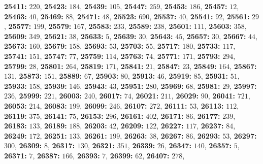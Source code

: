 \textsf{\bfseries 25411:} $220$, \textsf{\bfseries 25423:} $184$, \textsf{\bfseries 25439:} $105$, \textsf{\bfseries 25447:} $259$, \textsf{\bfseries 25453:} $186$, \textsf{\bfseries 25457:} $12$, \textsf{\bfseries 25463:} $40$, \textsf{\bfseries 25469:} $88$, \textsf{\bfseries 25471:} $48$, \textsf{\bfseries 25523:} $690$, \textsf{\bfseries 25537:} $40$, \textsf{\bfseries 25541:} $92$, \textsf{\bfseries 25561:} $29$, \textsf{\bfseries 25577:} $199$, \textsf{\bfseries 25579:} $167$, \textsf{\bfseries 25583:} $233$, \textsf{\bfseries 25589:} $238$, \textsf{\bfseries 25601:} $111$, \textsf{\bfseries 25603:} $358$, \textsf{\bfseries 25609:} $349$, \textsf{\bfseries 25621:} $38$, \textsf{\bfseries 25633:} $5$, \textsf{\bfseries 25639:} $30$, \textsf{\bfseries 25643:} $45$, \textsf{\bfseries 25657:} $30$, \textsf{\bfseries 25667:} $44$, \textsf{\bfseries 25673:} $160$, \textsf{\bfseries 25679:} $158$, \textsf{\bfseries 25693:} $53$, \textsf{\bfseries 25703:} $55$, \textsf{\bfseries 25717:} $180$, \textsf{\bfseries 25733:} $117$, \textsf{\bfseries 25741:} $151$, \textsf{\bfseries 25747:} $77$, \textsf{\bfseries 25759:} $114$, \textsf{\bfseries 25763:} $74$, \textsf{\bfseries 25771:} $171$, \textsf{\bfseries 25793:} $294$, \textsf{\bfseries 25799:} $28$, \textsf{\bfseries 25801:} $264$, \textsf{\bfseries 25819:} $171$, \textsf{\bfseries 25841:} $21$, \textsf{\bfseries 25847:} $23$, \textsf{\bfseries 25849:} $164$, \textsf{\bfseries 25867:} $131$, \textsf{\bfseries 25873:} $151$, \textsf{\bfseries 25889:} $67$, \textsf{\bfseries 25903:} $80$, \textsf{\bfseries 25913:} $46$, \textsf{\bfseries 25919:} $85$, \textsf{\bfseries 25931:} $51$, \textsf{\bfseries 25933:} $158$, \textsf{\bfseries 25939:} $146$, \textsf{\bfseries 25943:} $43$, \textsf{\bfseries 25951:} $280$, \textsf{\bfseries 25969:} $68$, \textsf{\bfseries 25981:} $29$, \textsf{\bfseries 25997:} $236$, \textsf{\bfseries 25999:} $221$, \textsf{\bfseries 26003:} $240$, \textsf{\bfseries 26017:} $74$, \textsf{\bfseries 26021:} $211$, \textsf{\bfseries 26029:} $90$, \textsf{\bfseries 26041:} $721$, \textsf{\bfseries 26053:} $214$, \textsf{\bfseries 26083:} $199$, \textsf{\bfseries 26099:} $246$, \textsf{\bfseries 26107:} $272$, \textsf{\bfseries 26111:} $53$, \textsf{\bfseries 26113:} $112$, \textsf{\bfseries 26119:} $375$, \textsf{\bfseries 26141:} $75$, \textsf{\bfseries 26153:} $296$, \textsf{\bfseries 26161:} $402$, \textsf{\bfseries 26171:} $86$, \textsf{\bfseries 26177:} $239$, \textsf{\bfseries 26183:} $133$, \textsf{\bfseries 26189:} $188$, \textsf{\bfseries 26203:} $42$, \textsf{\bfseries 26209:} $122$, \textsf{\bfseries 26227:} $117$, \textsf{\bfseries 26237:} $84$, \textsf{\bfseries 26249:} $172$, \textsf{\bfseries 26251:} $133$, \textsf{\bfseries 26261:} $199$, \textsf{\bfseries 26263:} $38$, \textsf{\bfseries 26267:} $86$, \textsf{\bfseries 26293:} $53$, \textsf{\bfseries 26297:} $300$, \textsf{\bfseries 26309:} $8$, \textsf{\bfseries 26317:} $130$, \textsf{\bfseries 26321:} $351$, \textsf{\bfseries 26339:} $26$, \textsf{\bfseries 26347:} $140$, \textsf{\bfseries 26357:} $5$, \textsf{\bfseries 26371:} $7$, \textsf{\bfseries 26387:} $166$, \textsf{\bfseries 26393:} $7$, \textsf{\bfseries 26399:} $62$, \textsf{\bfseries 26407:} $278$, 
